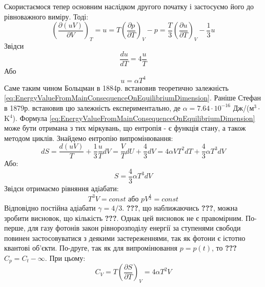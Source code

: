 \documentclass{article}
\begin{document}
\Task{}Скористаємося тепер основним наслідком другого початку і застосуємо його до рівноважного виміру. Тоді:
\begin{equation}
    \label{eq:MainConsequenceOnEquilibriumDimension_step1}
    \left(\frac{\partial(uV)}{\partial V}\right)_{T} = u = T \left(\frac{\partial p}{\partial T}\right)_{V} - p = 
    \frac{T}{3} \left(\frac{\partial u}{\partial T}\right)_{V} - \frac{1}{3} u
\end{equation}
Звідси
\begin{equation}
    \label{eq:MainConsequenceOnEquilibriumDimension_step2}
    \frac{du}{dT} = 4 \frac{u}{T}
\end{equation}
Або
\begin{equation}
    \label{eq:EnergyValueFromMainConsequenceOnEquilibriumDimension}
    u = \alpha T^{4}
\end{equation}
Саме таким чином Больцман в 1884р. встановив теоретично залежність \eqref{eq:EnergyValueFromMainConsequenceOnEquilibriumDimension}. Раніше Стефан в 1879р. встановив цю залежність експериментально, 
де $\alpha = 7.64 \cdot 10^{-16}$ Дж/(м$^{3} \cdot $ K$^{4}$). Формула \eqref{eq:EnergyValueFromMainConsequenceOnEquilibriumDimension} може бути отримана з тих міркувань, що ентропія - є функція стану, 
а також методом циклів. Знайдемо ентропію випромінювання: 
\begin{equation}
    \label{eq:RadiationEntropy}
    dS = \frac{d(uV)}{T} + \frac{1}{3} \frac{u}{T} dV = \frac{V}{T} dU + \frac{4}{3} dV = 4 \alpha V T^{2} dT + \frac{4}{3} \alpha T^{3} dV
\end{equation}
Або:
\begin{equation}
    \label{eq:RadiationEntropy_versionTWO}
    S = \frac{4}{3} \alpha T^{3} dV
\end{equation}
Звідси отримаємо рівняння адіабати:
\begin{equation}
    \label{eq:AdiabaticEquation}
    T^{3} V = const \text{ або } pV^{\tfrac{4}{3}} = const
\end{equation}
Відповідно постійна адіабати $\gamma = 4/3$. \textbf{???}, що наближаючись \textbf{???}, можна зробити висновок, що кількість \textbf{???}. Однак цей висновок не є правомірним. По-перше, для газу фотонів 
закон рівнорозподілу енергії за ступенями свободи повинен застосовуватися з деякими застереженнями, так як фотони є істотно квантові об'єкти. По-друге, так як для випромінювання $p = p(t)$, то \textbf{???} 
$C_{p} = C_{t} - \infty$. При цьому:
\begin{equation}
    \label{eq:HeatCapacityAtConstantVolume}
    C_{V} = T \left(\frac{\partial S}{\partial T}\right)_{V} = 4 \alpha T^{2} V
\end{equation}
\end{document}
